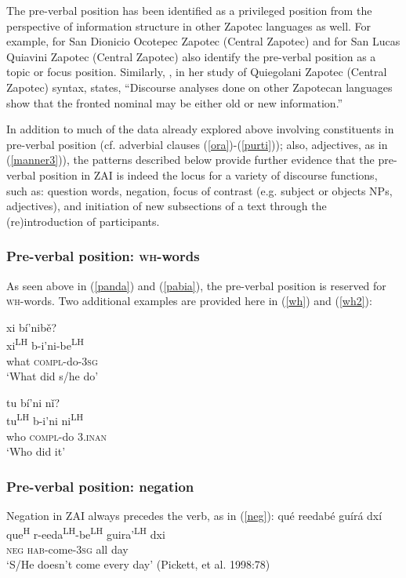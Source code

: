 The pre-verbal position has been identified as a privileged position from the perspective of information structure in other Zapotec languages as well. For example, \citet{broadwell2002} for San Dionicio Ocotepec Zapotec (Central Zapotec) and \citet{lee2000} for San Lucas Quiavini Zapotec (Central Zapotec) also identify the pre-verbal position as a topic or focus position. Similarly, \citet[103]{black2000}, in her study of Quiegolani Zapotec (Central Zapotec) syntax, states, ``Discourse analyses done on other Zapotecan languages show that the fronted nominal may be either old or new information.'' 

In addition to much of the data already explored above involving constituents in pre-verbal position (cf. adverbial clauses (\ref{ora})-(\ref{purti})); also, adjectives, as in  (\ref{manner3})), the patterns described below provide further evidence that the pre-verbal position in ZAI is indeed the locus for a variety of discourse functions, such as: question words, negation, focus of contrast (e.g. subject or objects NPs, adjectives), and initiation of new subsections of a text through the (re)introduction of participants.

\subsubsection{Pre-verbal position: \textsc{wh}-words}
As seen above in (\ref{panda}) and (\ref{pabia}), the pre-verbal position is reserved for \textsc{wh}-words. Two additional examples are provided here in (\ref{wh}) and (\ref{wh2}): 

\ea\label{wh}
xi b\'{i}'nib\v{e}? \\
xi\textsuperscript{LH} b-i'ni-be\textsuperscript{LH} \\
what \textsc{compl}-do-3\textsc{sg} \\
\glt `What did s/he do' 
\z

\ea\label{wh2}
tu b\'{i}'ni n\v{i}? \\
tu\textsuperscript{LH} b-i'ni ni\textsuperscript{LH} \\
who \textsc{compl}-do 3.\textsc{inan} \\
\glt `Who did it'  
\z

\subsubsection{Pre-verbal position: negation}
Negation in ZAI always precedes the verb, as in (\ref{neg}):
\ea\label{neg}
\glll qu\'{e} reedab\'{e} gu\'{i}r\'{a} dx\'{i} \\
 que\textsuperscript{H} r-eeda\textsuperscript{LH}-be\textsuperscript{LH} guira'\textsuperscript{LH} dxi \\
\textsc{neg} \textsc{hab}-come-3\textsc{sg} all day \\
\glt `S/He doesn't come every day' \hfill (Pickett, et al. 1998:78)

